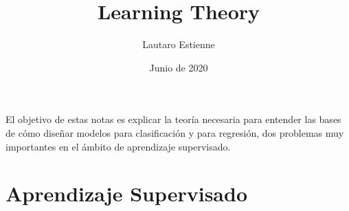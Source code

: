 \documentclass[12pt]{article}
\title{Learning Theory}
\author{Lautaro Estienne}
\date{Junio de 2020}
\begin{document}


\maketitle

El objetivo de estas notas es explicar la teoría necesaria para entender las bases de cómo diseñar modelos para clasificación y para regresión, dos problemas muy importantes en el ámbito de aprendizaje supervisado. 

\section{Aprendizaje Supervisado}

\end{document}
